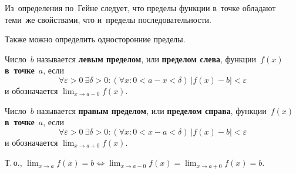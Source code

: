 Из~определения по~Гейне следует, что пределы функции в~точке обладают теми~же свойствами, что и~пределы последовательности.

Также можно определить односторонние пределы.

Число~$b$ называется \textbf{левым пределом}, или \textbf{пределом слева}, функции~$f(x)$ \textbf{в~точке}~$a$, если
\begin{equation*}
\forall \varepsilon > 0 \ \exists \delta > 0 \colon (\forall x \colon 0 < a - x < \delta) \ |f(x) - b| < \varepsilon
\end{equation*}
и обозначается $\displaystyle \lim_{x \to a-0} f(x)$.

Число~$b$ называется \textbf{правым пределом}, или \textbf{пределом справа}, функции~$f(x)$ \textbf{в~точке}~$a$, если
\begin{equation*}
\forall \varepsilon > 0 \ \exists \delta > 0 \colon (\forall x \colon 0 < x - a < \delta) \ |f(x) - b| < \varepsilon
\end{equation*}
и обозначается $\displaystyle \lim_{x \to a+0} f(x)$.

Т.\,о., $\displaystyle \lim_{x \to a} f(x) = b \Leftrightarrow \lim_{x \to a-0} f(x) = \lim_{x \to a+0} f(x) = b$.
